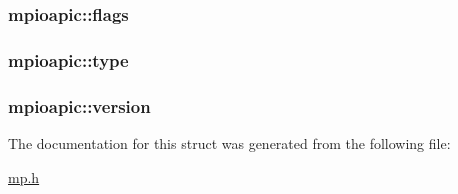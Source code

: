 \subsubsection[{\texorpdfstring{flags}{flags}}]{ mpioapic\+::flags}\hypertarget{structmpioapic_a9cc0f4c76312b7d074c558cbcad38a12}{}\label{structmpioapic_a9cc0f4c76312b7d074c558cbcad38a12}
\subsubsection[{\texorpdfstring{type}{type}}]{ mpioapic\+::type}\hypertarget{structmpioapic_a8d7527bad798d6f8a59a21df06879f0f}{}\label{structmpioapic_a8d7527bad798d6f8a59a21df06879f0f}
\subsubsection[{\texorpdfstring{version}{version}}]{ mpioapic\+::version}\hypertarget{structmpioapic_a7c6f3d950f89e2b982fd53f7c59681e7}{}\label{structmpioapic_a7c6f3d950f89e2b982fd53f7c59681e7}


The documentation for this struct was generated from the following file\+:\begin{DoxyCompactItemize}
\item 
\hyperlink{mp_8h}{mp.\+h}\end{DoxyCompactItemize}
